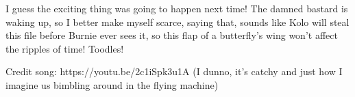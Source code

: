 I guess the exciting thing was going to happen next time! The damned bastard is waking up, so I better make myself scarce, saying that, sounds like Kolo will steal this file before Burnie ever sees it, so this flap of a butterfly’s wing won’t affect the ripples of time! Toodles!\medskip

Credit song: https://youtu.be/2c1iSpk3u1A (I dunno, it's catchy and just how I imagine us bimbling around in the flying machine)\medskip




%

\clearpage